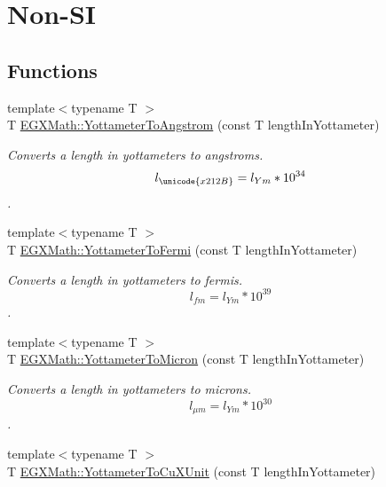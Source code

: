 \hypertarget{group___e_g_x_math-_conversions-_length_conversions-_yottameter-_non-_s_i}{}\section{Non-\/\+SI}
\label{group___e_g_x_math-_conversions-_length_conversions-_yottameter-_non-_s_i}
\subsection*{Functions}
\begin{DoxyCompactItemize}
\item 
{\footnotesize template$<$typename T $>$ }\\T \mbox{\hyperlink{group___e_g_x_math-_conversions-_length_conversions-_yottameter-_non-_s_i_ga0129b788ceb2d7d4ce86c155ee9d4675}{E\+G\+X\+Math\+::\+Yottameter\+To\+Angstrom}} (const T length\+In\+Yottameter)
\begin{DoxyCompactList}\small\item\em Converts a length in yottameters to angstroms. \[ l_{\unicode{x212B}}=l_{Ym} * 10^{34} \]. \end{DoxyCompactList}\item 
{\footnotesize template$<$typename T $>$ }\\T \mbox{\hyperlink{group___e_g_x_math-_conversions-_length_conversions-_yottameter-_non-_s_i_gabf900c05975691fab8c5df7de16a467c}{E\+G\+X\+Math\+::\+Yottameter\+To\+Fermi}} (const T length\+In\+Yottameter)
\begin{DoxyCompactList}\small\item\em Converts a length in yottameters to fermis. \[ l_{fm}=l_{Ym} * 10^{39} \]. \end{DoxyCompactList}\item 
{\footnotesize template$<$typename T $>$ }\\T \mbox{\hyperlink{group___e_g_x_math-_conversions-_length_conversions-_yottameter-_non-_s_i_gaad96d515763b1dfbcd968020e1b97de4}{E\+G\+X\+Math\+::\+Yottameter\+To\+Micron}} (const T length\+In\+Yottameter)
\begin{DoxyCompactList}\small\item\em Converts a length in yottameters to microns. \[ l_{\mu m}=l_{Ym} * 10^{30} \]. \end{DoxyCompactList}\item 
{\footnotesize template$<$typename T $>$ }\\T \mbox{\hyperlink{group___e_g_x_math-_conversions-_length_conversions-_yottameter-_non-_s_i_ga5c8a9868ad238225dbf8ebdbfad13930}{E\+G\+X\+Math\+::\+Yottameter\+To\+Cu\+X\+Unit}} (const T length\+In\+Yottameter)

\end{DoxyCompactItemize}
